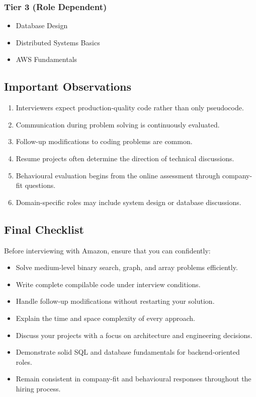 \documentclass[11pt,a4paper]{article}
\begin{document}
\subsubsection{Tier 3 (Role Dependent)}

\begin{itemize}
	\item Database Design
	\item Distributed Systems Basics
	\item AWS Fundamentals
\end{itemize}


\subsection{Important Observations}

\begin{enumerate}
	\item Interviewers expect production-quality code rather than only pseudocode.
	\item Communication during problem solving is continuously evaluated.
	\item Follow-up modifications to coding problems are common.
	\item Resume projects often determine the direction of technical discussions.
	\item Behavioural evaluation begins from the online assessment through company-fit questions.
	\item Domain-specific roles may include system design or database discussions.
\end{enumerate}


\subsection{Final Checklist}

Before interviewing with Amazon, ensure that you can confidently:

\begin{itemize}
	\item Solve medium-level binary search, graph, and array problems efficiently.
	\item Write complete compilable code under interview conditions.
	\item Handle follow-up modifications without restarting your solution.
	\item Explain the time and space complexity of every approach.
	\item Discuss your projects with a focus on architecture and engineering decisions.
	\item Demonstrate solid SQL and database fundamentals for backend-oriented roles.
	\item Remain consistent in company-fit and behavioural responses throughout the hiring process.
\end{itemize}
\end{document}

